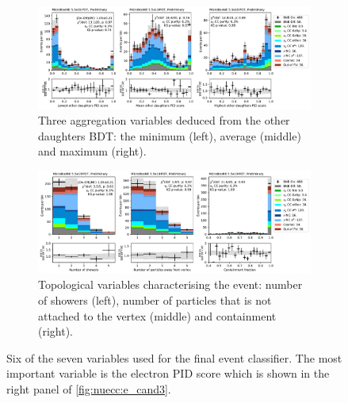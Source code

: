 \begin{figure}[t]
\centering
\begin{subfigure}{\textwidth}
    \centering
    \includegraphics[height=0.27\textheight]{NueCCsel/Images/datamc/event_bdt_input_1.pdf}
    \caption{Three aggregation variables deduced from the other daughters BDT: the minimum (left), average (middle) and maximum (right).}
    \label{fig:nuecc:bdt_event_input1}
    \end{subfigure}
    \begin{subfigure}{\textwidth}
    \centering
    \includegraphics[height=0.27\textheight]{NueCCsel/Images/datamc/event_bdt_input_2.pdf}
    \caption{Topological variables characterising the event: number of showers (left), number of particles that is not attached to the vertex (middle) and containment (right).}
    \label{fig:nuecc:bdt_event_input2}
    \end{subfigure}
\caption[Variables used for the final \nuecc event selection classifier]{Six of the seven variables used for the final \nuecc event classifier. The most important variable is the electron PID score which is shown in the right panel of \cref{fig:nuecc:e_cand3}.}
\label{fig:nuecc:bdt_event_input}
\end{figure}

